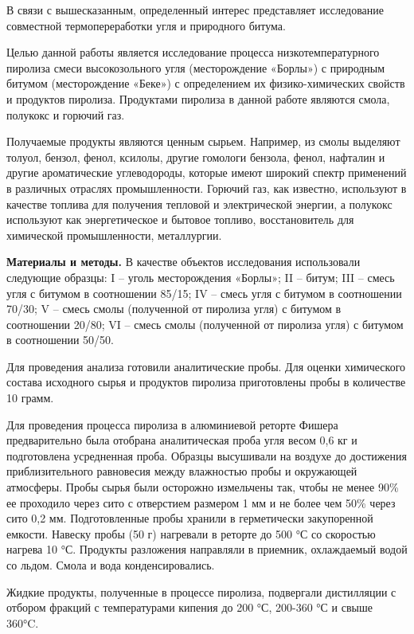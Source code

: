 В связи с вышесказанным, определенный интерес представляет исследование
совместной термопереработки угля и природного битума.

Целью данной работы является исследование процесса низкотемпературного
пиролиза смеси высокозольного угля (месторождение «Борлы») с природным
битумом (месторождение «Беке») с определением их физико-химических
свойств и продуктов пиролиза. Продуктами пиролиза в данной работе
являются смола, полукокс и горючий газ.

Получаемые продукты являются ценным сырьем. Например, из смолы выделяют
толуол, бензол, фенол, ксилолы, другие гомологи бензола, фенол, нафталин
и другие ароматические углеводороды, которые имеют широкий спектр
применений в различных отраслях промышленности. Горючий газ, как
известно, используют в качестве топлива для получения тепловой и
электрической энергии, а полукокс используют как энергетическое и
бытовое топливо, восстановитель для химической промышленности,
металлургии.

{\bfseries Материалы и методы.} В качестве объектов исследования
использовали следующие образцы: I -- уголь месторождения «Борлы»; II --
битум; III -- смесь угля с битумом в соотношении 85/15; IV -- смесь угля
с битумом в соотношении 70/30; V -- смесь смолы (полученной от пиролиза
угля) с битумом в соотношении 20/80; VI -- смесь смолы (полученной от
пиролиза угля) с битумом в соотношении 50/50.

Для проведения анализа готовили аналитические пробы. Для оценки
химического состава исходного сырья и продуктов пиролиза приготовлены
пробы в количестве 10 грамм.

Для проведения процесса пиролиза в алюминиевой реторте Фишера
предварительно была отобрана аналитическая проба угля весом 0,6 кг и
подготовлена усредненная проба. Образцы высушивали на воздухе до
достижения приблизительного равновесия между влажностью пробы и
окружающей атмосферы. Пробы сырья были осторожно измельчены так, чтобы
не менее 90\% ее проходило через сито с отверстием размером 1 мм и не
более чем 50\% через сито 0,2 мм. Подготовленные пробы хранили в
герметически закупоренной емкости. Навеску пробы (50 г) нагревали в
реторте до 500 °С со скоростью нагрева 10 °С. Продукты разложения
направляли в приемник, охлаждаемый водой со льдом. Смола и вода
конденсировались.

Жидкие продукты, полученные в процессе пиролиза, подвергали дистилляции
с отбором фракций с температурами кипения до 200 °С, 200-360 °С и свыше
360°C.

